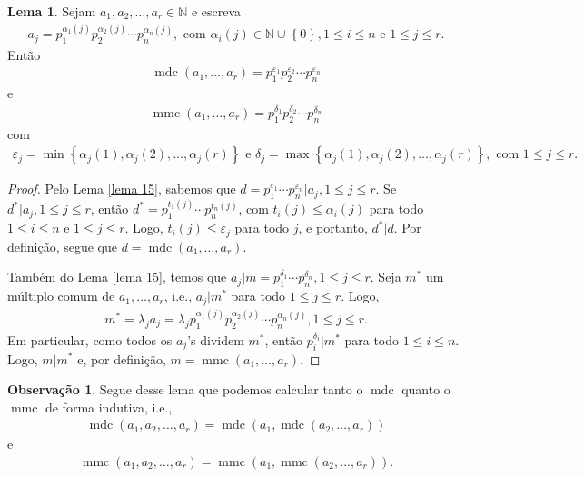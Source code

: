 \documentclass[a4paper,11pt,twoside, leqno]{article}
\DeclareMathOperator{\mdc}{mdc}
\DeclareMathOperator{\mmc}{mmc}
\theoremstyle{definition}
\newtheorem{lemma}[theorem]{Lema}
\newtheorem{remark}{Observação}[section]
\begin{document}
\begin{lemma}
	\label{lema 59}
	Sejam $a_1, a_2, \dots, a_r\in\mathbb{N}$ e escreva
	\begin{align*}
	a_j = p_1^{\alpha_1(j)}p_2^{\alpha_2(j)}\cdots p_n^{\alpha_n(j)}, \text{ com } \alpha_i(j)\in\mathbb{N}\cup\left\{0\right\}, 1\leq i\leq n \text{ e } 1\leq j\leq r.
	\end{align*}
	Então
	\begin{align*}
	\mdc(a_1, \dots, a_r) = p_1^{\varepsilon_1}p_2^{\varepsilon_2}\cdots p_n^{\varepsilon_n}
	\end{align*}
	e
	\begin{align*}
	\mmc(a_1, \dots, a_r) = p_1^{\delta_1}p_2^{\delta_2}\cdots p_n^{\delta_n}
	\end{align*}
	com
	\begin{align*}
	\varepsilon_j = \min\left\{ \alpha_j(1), \alpha_j(2), \dots, \alpha_j(r) \right\} \text{ e } \delta_j = \max\left\{ \alpha_j(1), \alpha_j(2), \dots, \alpha_j(r) \right\}, \text{ com } 1\leq j\leq r.
	\end{align*}
\end{lemma}
\begin{proof}
	Pelo Lema \eqref{lema 15}, sabemos que $d = p_1^{\varepsilon_1}\cdots p_n^{\varepsilon_n}|a_j, 1\leq j\leq r$. Se $d^\ast|a_j, 1\leq j\leq r$, então $d^\ast = p_1^{t_1(j)}\cdots p_n^{t_n(j)}$, com $t_i(j)\leq \alpha_i(j)$ para todo $1\leq i\leq n$ e $1\leq j\leq r$. Logo, $t_i(j)\leq\varepsilon_j$ para todo $j$, e portanto, $d^\ast|d$. Por definição, segue que $d = \mdc(a_1, \dots, a_r).$
	\par\vspace{0.3cm} Também do Lema \eqref{lema 15}, temos que $a_j|m = p_1^{\delta_1}\cdots p_n^{\delta_n}, 1\leq j\leq r$. Seja $m^\ast$ um múltiplo comum de $a_1, \dots, a_r$, i.e., $a_j|m^\ast$ para todo $1\leq j\leq r$. Logo,
	\begin{align*}
	m^\ast = \lambda_ja_j = \lambda_j  p_1^{\alpha_1(j)}p_2^{\alpha_2(j)}\cdots p_n^{\alpha_n(j)}, 1\leq j\leq r.
	\end{align*}
	Em particular, como todos os $a_j$'s dividem $m^\ast$, então $p_i^{\delta_i}|m^\ast$ para todo $1\leq i\leq n$. Logo, $m|m^\ast$ e, por definição, $m = \mmc(a_1, \dots, a_r).$
\end{proof}
\begin{remark}
	Segue desse lema que podemos calcular tanto o $\mdc$ quanto o $\mmc$ de forma indutiva, i.e.,
	\begin{align*}
	\mdc(a_1, a_2, \dots, a_r) = \mdc(a_1, \mdc(a_2, \dots, a_r))
	\end{align*}
	e
	\begin{align*}
	\mmc(a_1, a_2, \dots, a_r) = \mmc(a_1, \mmc(a_2, \dots, a_r)).
	\end{align*}
\end{remark}
\end{document}
